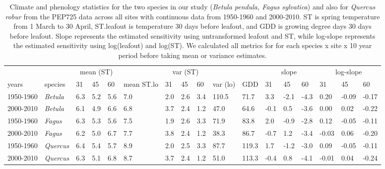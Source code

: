 \documentclass[11pt]{article}
\begin{document}
\begin{table}[ht]
\centering
\caption{Climate and phenology statistics for the two species in our study (\emph{Betula pendula, Fagus sylvatica}) and also for \emph{Quercus robur} from the PEP725 data across all sites with continuous data from 1950-1960 and 2000-2010. ST is spring temperature from 1 March to 30 April, ST.leafout is temperature 30 days before leafout, and GDD is growing degree days 30 days before leafout. Slope represents the estimated sensitivity using untransformed leafout and ST, while log-slope represents the estimated sensitivity using log(leafout) and log(ST). We calculated all metrics for for each species  x site x 10 year period before taking mean or variance estimates.} 
\label{tab:pep10yr}
\begingroup\footnotesize
\begin{tabular}{|p{}|p{}|p{}|p{}|p{}|p{}|p{}|p{}|p{}|p{}|p{}|p{}|p{}|p{}|p{}|p{}|p{}|}
  \hline
\multicolumn{1}{|c|}{} & \multicolumn{1}{|c|}{} & \multicolumn{3}{|c|}{mean (ST)} & \multicolumn{1}{|c|}{} & \multicolumn{3}{|c|}{var (ST)} & \multicolumn{1}{|c|}{} & \multicolumn{1}{|c|}{} & \multicolumn{3}{|c|}{slope} & \multicolumn{3}{|c|}{log-slope} \\  \cline{3-5} \cline{7-9} \cline{12-14} \cline{15-17}
  years & species & 31 & 45 & 60 & mean ST.lo & 31 & 45 & 60 & var (lo) & GDD & 31 & 45 & 60 & 31 & 45 & 60 \\ 
  \hline
1950-1960 & \emph{Betula} & 6.3 & 5.2 & 5.6 & 7.0 & 2.0 & 2.6 & 3.4 & 110.5 & 71.7 & 3.3 & -2.1 & -4.3 & 0.20 & -0.09 & -0.17 \\ 
  2000-2010 & \emph{Betula} & 6.1 & 4.9 & 6.6 & 6.8 & 3.7 & 2.4 & 1.2 & 47.0 & 64.6 & -0.1 & 0.5 & -3.6 & 0.00 & 0.02 & -0.22 \\ 
  1950-1960 & \emph{Fagus} & 6.3 & 5.3 & 5.6 & 7.5 & 1.9 & 2.6 & 3.3 & 71.9 & 83.8 & 2.0 & -0.9 & -2.8 & 0.12 & -0.05 & -0.11 \\ 
  2000-2010 & \emph{Fagus} & 6.2 & 5.0 & 6.7 & 7.7 & 3.8 & 2.4 & 1.2 & 38.3 & 86.7 & -0.7 & 1.2 & -3.4 & -0.03 & 0.06 & -0.20 \\ 
  1950-1960 & \emph{Quercus} & 6.4 & 5.4 & 5.7 & 8.9 & 2.0 & 2.5 & 3.3 & 87.7 & 119.3 & 1.7 & -1.2 & -3.0 & 0.09 & -0.05 & -0.11 \\ 
  2000-2010 & \emph{Quercus} & 6.3 & 5.1 & 6.8 & 8.7 & 3.7 & 2.4 & 1.2 & 51.0 & 113.3 & -0.4 & 0.8 & -4.1 & -0.01 & 0.04 & -0.24 \\ 
   \hline
\end{tabular}
\endgroup
\end{table}%
\end{document}
